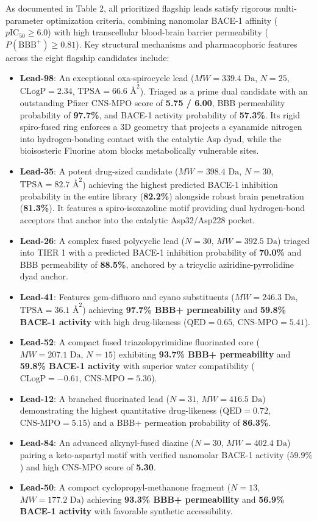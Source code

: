\documentclass[10pt,a4paper]{article}
\begin{document}
As documented in Table 2, all prioritized flagship leads satisfy rigorous multi-parameter optimization criteria, combining nanomolar BACE-1 affinity ($p\text{IC}_{50} \ge 6.0$) with high transcellular blood-brain barrier permeability ($P(\text{BBB}^+) \ge 0.81$). Key structural mechanisms and pharmacophoric features across the eight flagship candidates include:
\begin{itemize}[noitemsep]
    \item \textbf{Lead-98}: An exceptional oxa-spirocycle lead ($MW = 339.4\text{ Da}$, $N = 25$, $\text{CLogP} = 2.34$, $\text{TPSA} = 66.6\text{ \AA}^2$). Triaged as a prime dual candidate with an outstanding Pfizer CNS-MPO score of \textbf{5.75 / 6.00}, BBB permeability probability of \textbf{97.7\%}, and BACE-1 activity probability of \textbf{57.3\%}. Its rigid spiro-fused ring enforces a 3D geometry that projects a cyanamide nitrogen into hydrogen-bonding contact with the catalytic Asp dyad, while the bioisosteric Fluorine atom blocks metabolically vulnerable sites.
    \item \textbf{Lead-35}: A potent drug-sized candidate ($MW = 398.4\text{ Da}$, $N = 30$, $\text{TPSA} = 82.7\text{ \AA}^2$) achieving the highest predicted BACE-1 inhibition probability in the entire library (\textbf{82.2\%}) alongside robust brain penetration (\textbf{81.3\%}). It features a spiro-isoxazoline motif providing dual hydrogen-bond acceptors that anchor into the catalytic Asp32/Asp228 pocket.
    \item \textbf{Lead-26}: A complex fused polycyclic lead ($N = 30$, $MW = 392.5\text{ Da}$) triaged into TIER 1 with a predicted BACE-1 inhibition probability of \textbf{70.0\%} and BBB permeability of \textbf{88.5\%}, anchored by a tricyclic aziridine-pyrrolidine dyad anchor.
    \item \textbf{Lead-41}: Features gem-difluoro and cyano substituents ($MW = 246.3\text{ Da}$, $\text{TPSA} = 36.1\text{ \AA}^2$) achieving \textbf{97.7\% BBB+ permeability} and \textbf{59.8\% BACE-1 activity} with high drug-likeness ($\text{QED} = 0.65$, $\text{CNS-MPO} = 5.41$).
    \item \textbf{Lead-52}: A compact fused triazolopyrimidine fluorinated core ($MW = 207.1\text{ Da}$, $N = 15$) exhibiting \textbf{93.7\% BBB+ permeability} and \textbf{59.8\% BACE-1 activity} with superior water compatibility ($\text{CLogP} = -0.61$, $\text{CNS-MPO} = 5.36$).
    \item \textbf{Lead-12}: A branched fluorinated lead ($N = 31$, $MW = 416.5\text{ Da}$) demonstrating the highest quantitative drug-likeness ($\text{QED} = 0.72$, $\text{CNS-MPO} = 5.15$) and a BBB+ permeation probability of \textbf{86.3\%}.
    \item \textbf{Lead-84}: An advanced alkynyl-fused diazine ($N = 30$, $MW = 402.4\text{ Da}$) pairing a keto-aspartyl motif with verified nanomolar BACE-1 activity ($59.9\%$) and high CNS-MPO score of \textbf{5.30}.
    \item \textbf{Lead-50}: A compact cyclopropyl-methanone fragment ($N = 13$, $MW = 177.2\text{ Da}$) achieving \textbf{93.3\% BBB+ permeability} and \textbf{56.9\% BACE-1 activity} with favorable synthetic accessibility.
\end{itemize}
\end{document}
